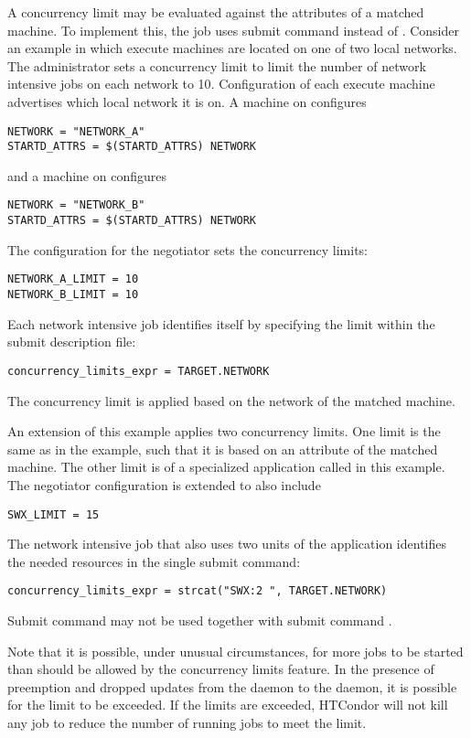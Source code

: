 A concurrency limit may be evaluated against the attributes of a 
matched machine.
To implement this, the job uses submit command 
 instead of
.
Consider an example in which execute machines are located on
one of two local networks.
The administrator sets a concurrency limit to limit the number
of network intensive jobs on each network to 10.
Configuration of each execute machine advertises which
local network it is on. 
A machine on  configures
\begin{verbatim}
NETWORK = "NETWORK_A"
STARTD_ATTRS = $(STARTD_ATTRS) NETWORK
\end{verbatim}
and a machine on  configures
\begin{verbatim}
NETWORK = "NETWORK_B"
STARTD_ATTRS = $(STARTD_ATTRS) NETWORK
\end{verbatim}

The configuration for the negotiator sets the concurrency limits:
\begin{verbatim}
NETWORK_A_LIMIT = 10
NETWORK_B_LIMIT = 10
\end{verbatim}

Each network intensive job identifies itself by specifying the limit
within the submit description file:
\begin{verbatim}
concurrency_limits_expr = TARGET.NETWORK
\end{verbatim}

The concurrency limit is applied based on the network
of the matched machine.

An extension of this example applies two concurrency limits.
One limit is the same as in the example, 
such that it is based on an attribute of the matched machine.
The other limit is of a specialized application
called  in this example.
The negotiator configuration is extended to also include
\begin{verbatim}
SWX_LIMIT = 15
\end{verbatim}

The network intensive job that also uses two units of the  
application identifies the needed resources in the single submit command:
\begin{verbatim}
concurrency_limits_expr = strcat("SWX:2 ", TARGET.NETWORK)
\end{verbatim}

Submit command  may not be used 
together with submit command .

Note that it is possible, under unusual circumstances, for more jobs to
be started than should be allowed by the concurrency limits feature.
In the presence of preemption and dropped updates from the
 daemon to the  daemon, 
it is possible for the limit to be exceeded. 
If the limits are exceeded,
HTCondor will not kill any job to reduce the number of running jobs to
meet the limit.

